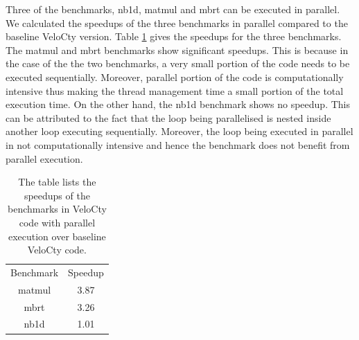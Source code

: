 Three of the \matlab benchmarks, nb1d, matmul and mbrt can be executed in parallel. We calculated the speedups of the three benchmarks in parallel compared to the baseline VeloCty version. Table \ref{tab:cpvscwo} gives the speedups for the three benchmarks. The matmul and mbrt benchmarks show significant speedups. This is because in the case of the the two benchmarks, a very small portion of the code needs to be executed sequentially. Moreover, parallel portion of the code is computationally intensive thus making the thread management time a small portion of the total execution time. On the other hand, the nb1d benchmark shows no speedup. This can be attributed to the fact that the loop being parallelised is nested inside another loop executing sequentially. Moreover, the loop being executed in parallel in not computationally intensive and hence the benchmark does not benefit from parallel execution. 
\begin{table}[htbp]
\centering
\begin{tabular}{|c|c|}
\hline
Benchmark & Speedup \\ \hhline{|=|=|}
matmul    & 3.87    \\ \hline
mbrt      & 3.26    \\ \hline
nb1d      & 1.01    \\ \hline
\end{tabular}
\caption[Speedup of Generated Code with Parallel constructs]{The table lists the speedups of the benchmarks in VeloCty code with parallel execution over baseline VeloCty code.}
\label{tab:cpvscwo}
\end{table}

